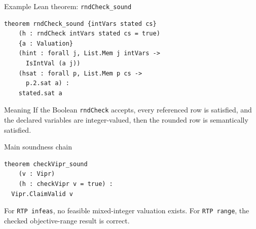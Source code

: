 \documentclass[aspectratio=169,11pt]{beamer}
\newcommand{\code}[1]{\texttt{#1}}
\begin{document}
\begin{frame}[fragile]{Example Lean theorem: \code{rndCheck\_sound}}
\begin{lstlisting}
theorem rndCheck_sound {intVars stated cs}
    (h : rndCheck intVars stated cs = true)
    {a : Valuation}
    (hint : forall j, List.Mem j intVars ->
      IsIntVal (a j))
    (hsat : forall p, List.Mem p cs ->
      p.2.sat a) :
    stated.sat a
\end{lstlisting}

  \begin{block}{Meaning}
    If the Boolean \code{rndCheck} accepts, every referenced row is satisfied,
    and the declared variables are integer-valued, then the rounded row is
    semantically satisfied.
  \end{block}
\end{frame}

\begin{frame}[fragile]{Main soundness chain}
  \begin{center}
  \end{center}

\vspace{-0.35em}
\begin{lstlisting}
theorem checkVipr_sound
    (v : Vipr)
    (h : checkVipr v = true) :
  Vipr.ClaimValid v
\end{lstlisting}

  For \code{RTP infeas}, no feasible mixed-integer valuation exists.
  For \code{RTP range}, the checked objective-range result is correct.
\end{frame}
\end{document}
